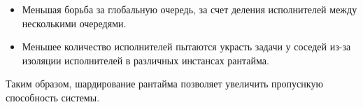 \begin{itemize}
    \item Меньшая борьба за глобальную очередь, за счет деления исполнителей между несколькими очередями.
    \item Меньшее количество исполнителей пытаются украсть задачи у соседей из-за изоляции исполнителей в различных инстансах рантайма.
\end{itemize}

Таким образом, шардирование рантайма позволяет увеличить пропуснкую способность системы.
